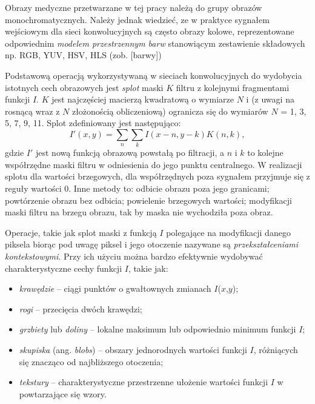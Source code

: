 Obrazy medyczne przetwarzane w tej pracy należą do grupy obrazów monochromatycznych. Należy jednak wiedzieć, ze w praktyce sygnałem wejściowym dla sieci konwolucyjnych są często obrazy kolowe, reprezentowane odpowiednim  \textit{modelem przestrzennym barw} stanowiącym zestawienie składowych np. RGB, YUV, HSV, HLS (zob. [barwy])

Podstawową operacją wykorzystywaną w sieciach konwolucyjnych do wydobycia istotnych cech obrazowych jest \textit{splot} maski $K$ filtru z kolejnymi fragmentami funkcji $I$. $K$ jest najczęściej macierzą kwadratową o wymiarze $N$ i (z uwagi na rosnącą wraz z $N$ złożonością obliczeniową) ogranicza się do wymiarów $N$ = {1, 3, 5, 7, 9, 11}. Splot zdefiniowany jest następująco:
\begin{equation}
	I'\left(x, y\right) = \sum_{n} \sum_{k} I\left(x - n, y - k \right)K\left(n, k\right),
\end{equation}
gdzie $I'$ jest nową funkcją obrazową powstałą po filtracji, a $n$ i $k$ to kolejne współrzędne maski filtru w odniesienia do jego punktu centralnego. W realizacji splotu dla wartości brzegowych, dla współrzędnych poza sygnałem przyjmuje się z reguły wartości 0. Inne metody to: odbicie obrazu poza jego granicami; powtórzenie obrazu bez odbicia; powielenie brzegowych wartości; modyfikacji maski filtru na brzegu obrazu, tak by maska nie wychodziła poza obraz.

Operacje, takie jak splot maski z funkcją $I$ polegające na modyfikacji danego piksela biorąc pod uwagę piksel i jego otoczenie nazywane są \textit{przekształceniami kontekstowymi}. Przy ich użyciu można bardzo efektywnie wydobywać charakterystyczne cechy funkcji $I$, takie jak: 
\begin{itemize}
	\item \textit{krawędzie} -- ciągi punktów o gwałtownych zmianach $I$($x$,$y$);
	\item \textit{rogi} -- przecięcia dwóch krawędzi;
	\item \textit{grzbiety} lub \textit{doliny} -- lokalne maksimum lub odpowiednio minimum funkcji $I$;
	\item \textit{skupiska} (ang. \textit{blobs}) -- obszary jednorodnych wartości funkcji $I$, różniących się znacząco od najbliższego otoczenia; 
	\item \textit{tekstury} -- charakterystyczne przestrzenne ułożenie wartości funkcji $I$ w powtarzające się wzory.
\end{itemize}


